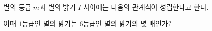 별의 등급 $m$과 별의 밝기 $I$ 사이에는 다음의 관계식이 성립한다고 한다. \par\smallskip{}\par\smallskip\noindent 이때 $1$등급인 별의 밝기는 $6$등급인 별의 밝기의 몇 배인가?
